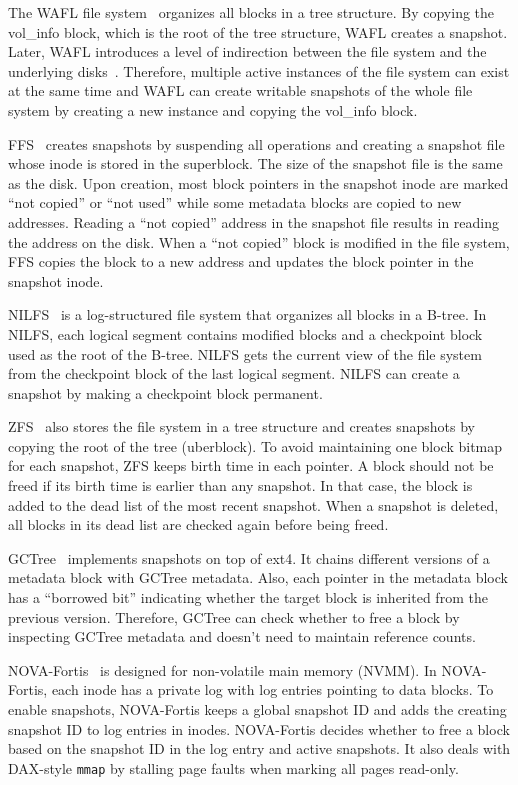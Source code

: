 The WAFL file system~\citep{wafl} organizes all blocks in a tree structure.
By copying the vol\_info block, which is the root of the tree structure, WAFL
creates a snapshot.
Later, WAFL introduces a level of indirection between the file system and the
underlying disks~\citep{wafl-flexvol}.
Therefore, multiple active instances of the file system can exist at the same
time and WAFL can create writable snapshots of the whole file system by creating
a new instance and copying the vol\_info block.

FFS~\citep{ffs1,ffs2} creates snapshots by suspending all operations and creating a
snapshot file whose inode is stored in the superblock.
The size of the snapshot file is the same as the disk.
Upon creation, most block pointers in the snapshot inode are marked
``not copied'' or ``not used'' while some metadata blocks are copied to new
addresses.
Reading a ``not copied'' address in the snapshot file results in reading the
address on the disk.
When a ``not copied'' block is modified in the file system, FFS copies the block
to a new address and updates the block pointer in the snapshot inode.

NILFS~\citep{nilfs2} is a log-structured file system that organizes all blocks
in a B-tree.
In NILFS, each logical segment contains modified blocks and a checkpoint block
used as the root of the B-tree.
NILFS gets the current view of the file system from the checkpoint block
of the last logical segment.
NILFS can create a snapshot by making a checkpoint block permanent.

ZFS~\citep{zfs} also stores the file system in a tree structure and creates
snapshots by copying the root of the tree (uberblock).
To avoid maintaining one block bitmap for each snapshot, ZFS keeps birth time
in each pointer.
A block should not be freed if its birth time is earlier than any snapshot.
In that case, the block is added to the dead list of the most recent snapshot.
When a snapshot is deleted, all blocks in its dead list are checked again before
being freed.

GCTree~\citep{gctree} implements snapshots on top of ext4.
It chains different versions of a metadata block with GCTree metadata.
Also, each pointer in the metadata block has a ``borrowed bit'' indicating
whether the target block is inherited from the previous version.
Therefore, GCTree can check whether to free a block by inspecting GCTree
metadata and doesn't need to maintain reference counts.

NOVA-Fortis~\citep{nova} is designed for non-volatile main memory (NVMM).
In NOVA-Fortis, each inode has a private log with log entries pointing
to data blocks.
To enable snapshots, NOVA-Fortis keeps a global snapshot ID and adds the
creating snapshot ID to log entries in inodes.
NOVA-Fortis decides whether to free a block based on the snapshot ID in the log
entry and active snapshots.
It also deals with DAX-style \texttt{mmap} by stalling page faults when marking
all pages read-only.

